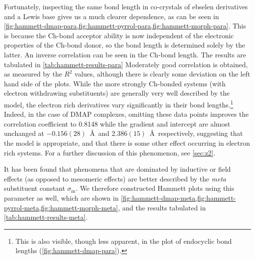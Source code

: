 \begin{refsection}
Fortunately, inspecting the same bond length in co-crystals of ebselen derivatives and a Lewis base gives us a much clearer dependence, as can be seen in \cref{fig:hammett-dmap-para,fig:hammett-pyrrol-para,fig:hammett-morph-para}.
This is because the Ch-bond acceptor ability is now independent of the electronic properties of the Ch-bond donor, so the  bond length is determined solely by the latter.
An inverse correlation can be seen in the  Ch-bond length.
The results are tabulated in \cref{tab:hammett-results-para}
Moderately good correlation is obtained, as measured by the $R^2$ values, although there is clearly some deviation on the left hand side of the plots.
While the more strongly Ch-bonded systems (with electron withdrawing substituents) are generally very well described by the model, the electron rich derivatives  vary significantly in their bond lengths.\footnote{This is also visible, though less apparent, in the plot of endocyclic bond lengths (\cref{fig:hammett-dmap-para}).}
Indeed, in the case of DMAP complexes, omitting these data points improves the correlation coefficient to 0.8148 while the gradient and intercept are almost unchanged at $-0.156(28)$~\AA~and $2.386(15)$~\AA~respectively, suggesting that the model is appropriate, and that there is some other effect occurring in electron rich systems.
For a further discussion of this phenomenon, see \cref{sec:z2}.

It has been found that phenomena that are dominated by inductive or field effects (as opposed to mesomeric effects) are better described by the \textit{meta} substituent constant $\sigma_\text{m}$.\autocite{Reynolds1980,Sarwar2010}
We therefore constructed Hammett plots using this parameter as well, which are shown in \cref{fig:hammett-dmap-meta,fig:hammett-pyrrol-meta,fig:hammett-morph-meta}, and the results tabulated in \cref{tab:hammett-results-meta}.


\end{refsection}

